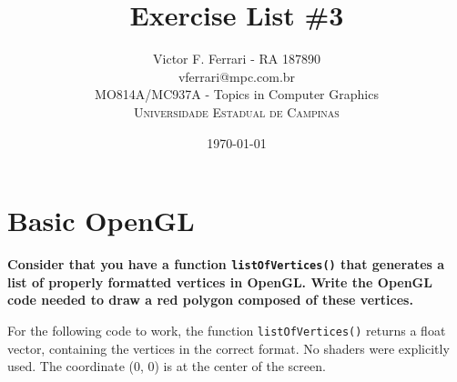 \documentclass[12pt]{article}
\title{Exercise List \#3} %
\author{Victor F. Ferrari - RA 187890\\ %
vferrari@mpc.com.br\\
MO814A/MC937A - Topics in Computer Graphics\\ %
\textsc{Universidade Estadual de Campinas}
}
\date{\today} %
\begin{document}
\setlength{\droptitle}{-5em}    
\maketitle


\section{Basic OpenGL}
{\bfseries Consider that you have a function \texttt{listOfVertices()} that generates a list of properly formatted vertices in OpenGL. Write the OpenGL code needed to draw a red polygon composed of these vertices.}

For the following code to work, the function \texttt{listOfVertices()} returns a float vector, containing the vertices in the correct format. No shaders were explicitly used. The coordinate (0, 0) is at the center of the screen.
\end{document}
